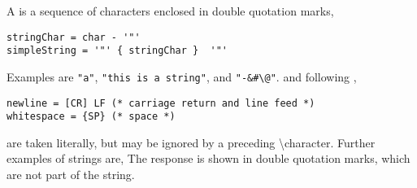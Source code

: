 A  is a sequence of characters enclosed in double quotation marks,
%
\begin{lstlisting}[language=ebnf]
stringChar = char - '"'
simpleString = '"' { stringChar }  '"'
\end{lstlisting}
% 
Examples are \lstinline{"a"}, \lstinline{"this is a string"}, and \lstinline{"-&#\@"}.  and following ,
\begin{lstlisting}[language=ebnf,label=newlineNWhitespace]
newline = [CR] LF (* carriage return and line feed *)
whitespace = {SP} (* space *)
\end{lstlisting}
are taken literally, but may be ignored by a preceding \textbackslash character. Further examples of strings are,
%
%
The response is shown in double quotation marks, which are not part of the string. 

